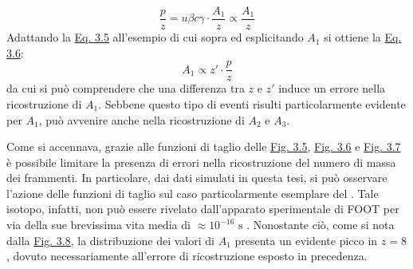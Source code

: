 \documentclass[12pt,a4paper,twoside]{report}
\begin{document}
	\begin{equation}
		\frac{p}{z}=u\beta c\gamma\cdot \frac{A_1}{z}\propto\frac{A_1}{z}
		\label{eq:error_reconstruction}
	\end{equation}
	Adattando la \hyperref[eq:error_reconstruction]{Eq. 3.5} all'esempio di cui sopra ed esplicitando $A_1$ si ottiene la \hyperref[eq:error_reconstruction_final]{Eq. 3.6}:
	\begin{equation}
		A_1\propto z'\cdot\frac{p}{z}
		\label{eq:error_reconstruction_final}
	\end{equation}
	da cui si può comprendere che una differenza tra $z$ e $z'$ induce un errore nella ricostruzione di $A_1$. Sebbene questo tipo di eventi risulti particolarmente evidente per $A_1$, può avvenire anche nella ricostruzione di $A_2$ e $A_3$.
	
	Come si accennava, grazie alle funzioni di taglio delle \hyperref[fig:a1_cut]{Fig. 3.5}, \hyperref[fig:a2_cut]{Fig. 3.6} e \hyperref[fig:a3_cut]{Fig. 3.7} è possibile limitare la presenza di errori nella ricostruzione del numero di massa dei frammenti. In particolare, dai dati simulati in questa tesi, si può osservare l'azione delle funzioni di taglio sul caso particolarmente esemplare del . Tale isotopo, infatti, non può essere rivelato dall'apparato sperimentale di FOOT per via della sue brevissima vita media di $\approx10^{-16}\mbox{ s}$ \cite{TILLEY2004155}. Nonostante ciò, come si nota dalla \hyperref[fig:berillium]{Fig. 3.8}, la distribuzione dei valori di $A_1$ presenta un evidente picco in $z=8$, dovuto necessariamente all'errore di ricostruzione esposto in precedenza.
\end{document}
